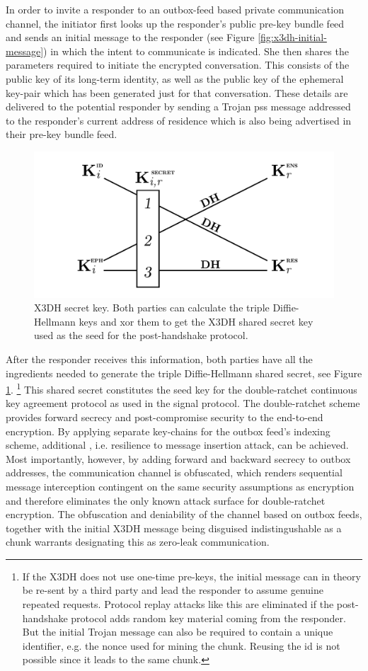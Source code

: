 In order to invite a responder to an outbox-feed based private communication channel, the initiator first looks up the responder's public pre-key bundle feed and sends an initial message to the responder (see Figure \ref{fig:x3dh-initial-message}) in which the intent to communicate is indicated. She then shares the parameters required to initiate the encrypted conversation. This consists of the public key of its long-term identity, as well as the public key of the ephemeral key-pair which has been generated just for that conversation. These details are delivered to the potential responder by sending a Trojan pss message addressed to the responder's current address of residence which is also being advertised in their pre-key bundle feed. 

\begin{figure}[htbp]
   \centering
   \includegraphics[width=.6\textwidth]{fig/x3dh.pdf}
   \caption[X3DH secret key \statusgreen]{X3DH secret key. Both parties can calculate the triple Diffie-Hellmann keys and xor them to get the X3DH shared secret key used as the seed for the post-handshake protocol.}
   \label{fig:x3dh}
\end{figure}

After the responder receives this information, both parties have all the ingredients needed to generate the triple Diffie-Hellmann shared secret, see Figure \ref{fig:x3dh}.%
%
\footnote{If the X3DH does not use one-time pre-keys, the initial message can in theory be re-sent by a third party and lead the responder to assume genuine repeated requests. Protocol replay attacks like this are eliminated if the post-handshake protocol adds random key material coming from the responder. 
But the initial Trojan message can also be required to contain a unique identifier, e.g. the nonce used for mining the chunk. Reusing the id is not possible since it leads to the same chunk.}
%
This shared secret constitutes the seed key for the double-ratchet continuous key agreement protocol as used in the signal protocol. The double-ratchet scheme provides forward secrecy and post-compromise security to the end-to-end encryption. By applying separate key-chains for the outbox feed's indexing scheme, additional , i.e. resilience to message insertion attack, can be achieved. Most importantly, however, by adding forward and backward secrecy to outbox addresses, the communication channel is obfuscated, which renders sequential message interception contingent on the same security assumptions as encryption and therefore eliminates the only known attack surface for double-ratchet encryption. The obfuscation and deniability of the channel based on outbox feeds, together with the initial X3DH message being disguised indistingushable as a chunk warrants designating this as  zero-leak communication.

